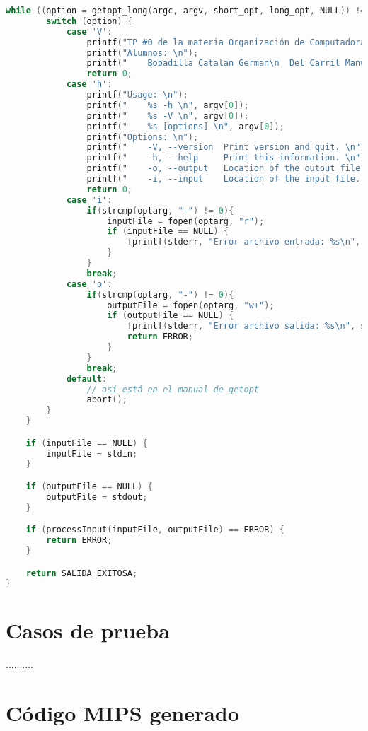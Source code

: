 \documentclass[a4paper]{article}
\begin{document}
\begin{lstlisting}[language=C]
    while ((option = getopt_long(argc, argv, short_opt, long_opt, NULL)) != -1) {
        switch (option) {
            case 'V':
                printf("TP #0 de la materia Organización de Computadoras \n");
                printf("Alumnos: \n");
                printf("	Bobadilla Catalan German\n	Del Carril Manuel \n	Quino Lopez Julian \n");
                return 0;
            case 'h':
                printf("Usage: \n");
                printf("	%s -h \n", argv[0]);
                printf("	%s -V \n", argv[0]);
                printf("	%s [options] \n", argv[0]);
                printf("Options: \n");
                printf("	-V, --version  Print version and quit. \n");
                printf("	-h, --help     Print this information. \n");
                printf("	-o, --output   Location of the output file. \n");
                printf("	-i, --input    Location of the input file. \n");
                return 0;
            case 'i':
            	if(strcmp(optarg, "-") != 0){
					inputFile = fopen(optarg, "r");
					if (inputFile == NULL) {
						fprintf(stderr, "Error archivo entrada: %s\n", strerror(errno));
					}
            	}
                break;
            case 'o':
            	if(strcmp(optarg, "-") != 0){
					outputFile = fopen(optarg, "w+");
					if (outputFile == NULL) {
						fprintf(stderr, "Error archivo salida: %s\n", strerror(errno));
						return ERROR;
					}
            	}
                break;
            default:
                // así está en el manual de getopt
                abort();
        }
    }

    if (inputFile == NULL) {
        inputFile = stdin;
    }

    if (outputFile == NULL) {
        outputFile = stdout;
    }

    if (processInput(inputFile, outputFile) == ERROR) {
    	return ERROR;
    }

    return SALIDA_EXITOSA;
}

\end{lstlisting}

\section{Casos de prueba}

..........

\section{Código MIPS generado} 
\end{document}
